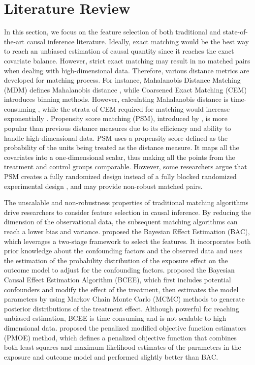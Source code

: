 \section{Literature Review}

In this section, we focus on the feature selection of both traditional and state-of-the-art causal inference literature. Ideally, exact matching would be the best way to reach an unbiased estimation of causal quantity since it reaches the exact covariate balance. However, strict exact matching may result in no matched pairs when dealing with high-dimensional data. Therefore, various distance metrics are developed for matching process. For instance, Mahalanobis Distance Matching (MDM) defines Mahalanobis distance \cite{rubin1979using}, while Coarsened Exact Matching (CEM) \cite{iacus2012causal} introduces binning methods. However, calculating Mahalanobis distance is time-consuming \citep{stuart2010matching}, while the strata of CEM required for matching would increase exponentially \citep{roberts2015matching}. Propensity score matching (PSM), introduced by \cite{rosenbaum1983central}, is more popular than previous distance measures due to its efficiency and ability to handle high-dimensional data. PSM uses a propensity score defined as the probability of the units being treated as the distance measure. It maps all the covariates into a one-dimensional scalar, thus making all the points from the treatment and control groups comparable. However, some researchers argue that PSM creates a fully randomized design instead of a fully blocked randomized experimental design \citep{king2019propensity}, and may provide non-robust matched pairs.

The unscalable and non-robustness properties of traditional matching algorithms drive researchers to consider feature selection in causal inference. By reducing the dimension of the observational data, the subsequent matching algorithms can reach a lower bias and variance. \cite{wang2012bayesian} proposed the Bayesian Effect Estimation (BAC), which leverages a two-stage framework to select the features. It incorporates both prior knowledge about the confounding factors and the observed data and uses the estimation of the probability distribution of the exposure effect on the outcome model to adjust for the confounding factors. \cite{talbot2015bayesian} proposed the Bayesian Causal Effect Estimation Algorithm (BCEE), which first includes potential confounders and modify the effect of the treatment, then estimates the model parameters by using Markov Chain Monte Carlo (MCMC) methods to generate posterior distributions of the treatment effect. Although powerful for reaching unbiased estimation, BCEE is time-consuming and is not scalable to high-dimensional data. \cite{ertefaie2018variable} proposed the penalized modified objective function estimators (PMOE) method, which defines a penalized objective function that combines both least squares and maximum likelihood estimates of the parameters in the exposure and outcome model and performed slightly better than BAC.


